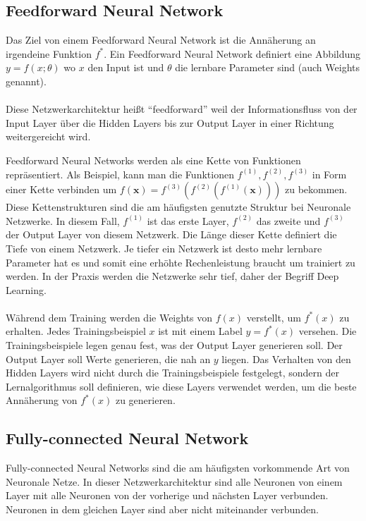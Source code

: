 \subsection{Feedforward Neural Network}
Das Ziel von einem Feedforward Neural Network ist die Annäherung an irgendeine Funktion $ f^* $. Ein Feedforward Neural Network definiert 
eine Abbildung $ y = f(x;\theta) $ wo $ x $ den Input ist und $ \theta $ die lernbare Parameter sind (auch Weights genannt).
\cite[164-223]{Goodfellow-et-al-2016}
\\
\\
Diese Netzwerkarchitektur heißt ``feedforward'' weil der Informationsfluss von der Input \gls{Layer} über die Hidden Layers bis zur Output \gls{Layer} 
in einer Richtung weitergereicht wird.

Feedforward Neural Networks werden als eine Kette von Funktionen repräsentiert. Als Beispiel,
kann man die Funktionen $ f^{(1)}, f^{(2)}, f^{(3)} $ in Form einer Kette verbinden um $ f(\textbf{x}) = f^{(3)}(f^{(2)}(f^{(1)}(\textbf{x}))) $
zu bekommen. Diese Kettenstrukturen sind die am häufigsten genutzte Struktur bei Neuronale Netzwerke. In diesem Fall, $ f^{(1)} $ ist das 
erste Layer, $ f^{(2)} $ das zweite und $ f^{(3)} $ der Output Layer von diesem Netzwerk. Die Länge dieser Kette definiert die Tiefe von
einem Netzwerk. Je tiefer
ein Netzwerk ist desto mehr lernbare Parameter hat es und somit eine erhöhte Rechenleistung braucht um trainiert zu werden.
In der Praxis werden die Netzwerke sehr tief, daher der Begriff Deep Learning.
\\
\\
Während dem Training werden die Weights von $ f(x) $ verstellt, um $ f^*(x) $ zu erhalten. Jedes Trainingsbeispiel $ x $ ist mit einem Label
$ y = f^*(x)$ versehen. Die Trainingsbeispiele legen genau fest, was der Output Layer generieren soll. Der Output Layer soll Werte generieren,
die nah an $ y $ liegen. Das Verhalten von den Hidden Layers wird nicht durch die Trainingsbeispiele festgelegt, sondern der Lernalgorithmus
soll definieren, wie diese Layers verwendet werden, um die beste Annäherung von $ f^*(x) $ zu generieren. \cite[164-223]{Goodfellow-et-al-2016}

\subsection{Fully-connected Neural Network}
Fully-connected Neural Networks sind die am häufigsten vorkommende Art von Neuronale Netze. In dieser Netzwerkarchitektur sind alle Neuronen
von einem Layer mit alle Neuronen von der vorherige und nächsten Layer verbunden. Neuronen in dem gleichen Layer sind aber nicht miteinander verbunden.
\cite{cs231-neural-networks}


